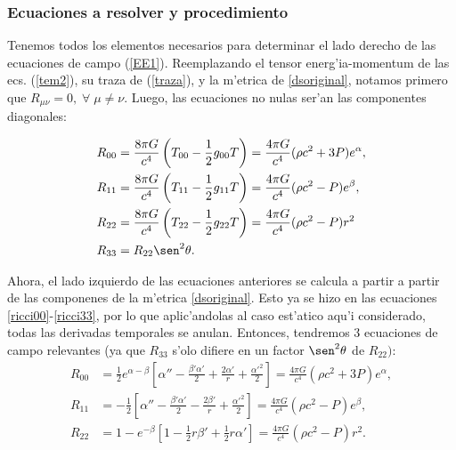\subsubsection{Ecuaciones a resolver y procedimiento}
Tenemos todos los elementos necesarios para determinar el lado derecho de las ecuaciones de campo (\ref{EE1}). Reemplazando el tensor energ'ia-momentum de las ecs. (\ref{tem2}), su traza de (\ref{traza}), y la m'etrica de \eqref{dsoriginal}, notamos primero que $R_{\mu\nu}=0,\;\forall\; \mu\neq\nu$. Luego, las ecuaciones no nulas ser'an las componentes diagonales:

\begin{align}
 R_{00}&=\frac{8\pi G}{c^{4}}\left( T_{00}-\dfrac{1}{2}g_{00}T\right)=
\frac{4\pi G}{c^{4}}(\rho c^2+3P)e^{\alpha},\\
R_{11}&=\frac{8\pi G}{c^{4}}\left( T_{11}-\dfrac{1}{2}g_{11}T\right)=
\frac{4\pi G}{c^{4}}(\rho c^2-P)e^{\beta},\\
R_{22}&=\frac{8\pi G}{c^{4}}\left(T_{22}-\dfrac{1}{2}g_{22}T\right)=
\frac{4\pi G}{c^{4}}(\rho c^2-P)r^2\\
R_{33}&=R_{22}\sen^2\theta.
\end{align}

Ahora, el lado izquierdo de las ecuaciones anteriores se calcula a partir a partir de las componenes de la m'etrica \eqref{dsoriginal}. Esto ya se hizo en las ecuaciones \eqref{ricci00}-\eqref{ricci33}, por lo que aplic'andolas al caso est'atico aqu'i considerado, todas las derivadas temporales se anulan. Entonces, tendremos 3 ecuaciones de campo relevantes (ya que $R_{33}$ s'olo difiere en un factor $\sen^2\theta$ de $R_{22})$:
\begin{align}
R_{00}&=\frac{1}{2}e^{\alpha-\beta}\left[\alpha''-\frac{\beta'\alpha'}{2}+\frac{2\alpha'}{r}+\frac{\alpha'^2}{2}\right]=\frac{4\pi G}{c^{4}}\left( \rho c^2+3P\right)e^{\alpha},\label{ricci0}\\
R_{11}&=-\frac{1}{2}\left[\alpha''-\frac{\beta'\alpha'}{2}-\frac{2\beta'}{r}+\frac{\alpha'^2}{2}\right]=\frac{4\pi G}{c^{4}}\left( \rho c^2-P\right)e^{\beta},\label{ricci1} \\
R_{22}&=1-e^{-\beta}\left[1-\frac{1}{2}r\beta'+\frac{1}{2}r\alpha'\right]=\frac{4\pi G}{c^{4}}\left( \rho c^2-P\right)r^2. \label{ricci2}
\end{align}

